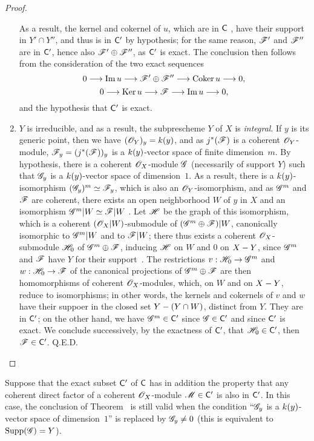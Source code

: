 \begin{proof}
\begin{enumerate}[label=(\alph*)]
    As a result, the kernel and cokernel of $u$, which are in $\mathsf{C}$ , have their support in $Y'\cap Y''$, and thus is in $\mathsf{C}'$ by hypothesis; for the same reason, $\mathscr{F}'$ and $\mathscr{F}''$ are in $\mathsf{C}'$, hence also $\mathscr{F}'\oplus\mathscr{F}''$, as $\mathsf{C}'$ is exact.
    The conclusion then follows from the consideration of the two exact sequences
    \[
      0\to\Im u\to\sh{F}'\oplus\sh{F}''\to\Coker u\to 0,
    \]
    \[
      0\to\Ker u\to\sh{F}\to\Im u\to 0,
    \]
    and the hypothesis that $\mathsf{C}'$ is exact.
  \item $Y$ is irreducible, and as a result, the subprescheme $Y$ of $X$ is \emph{integral}.
    If $y$ is its generic point, then we have $(\mathscr{O}_Y)_y=k(y)$, and as $j^*(\mathscr{F})$ is a coherent $\mathscr{O}_Y$-module, $\mathscr{F}_y=(j^*(\mathscr{F}))_y$ is a $k(y)$-vector space of finite dimension~$m$.
    By hypothesis, there is a coherent $\mathscr{O}_X$-module $\mathscr{G}$ (necessarily of support $Y$) such that $\mathscr{G}_y$ is a $k(y)$-vector space of dimension~$1$.
    As a result, there is a $k(y)$-isomorphism $(\mathscr{G}_y)^m\simeq\mathscr{F}_y$, which is also an $\mathscr{O}_Y$-isomorphism, and as $\mathscr{G}^m$ and $\mathscr{F}$ are coherent, there exists an open neighborhood $W$ of $y$ in $X$ and an isomorphism $\mathscr{G}^m|W\simeq\mathscr{F}|W$ .
    Let $\mathscr{H}$ be the graph of this isomorphism, which is a coherent $(\mathscr{O}_X|W)$-submodule of $(\mathscr{G}^m\oplus\mathscr{F})|W$, canonically isomorphic to $\mathscr{G}^m|W$ and to $\mathscr{F}|W$; there thus exists a coherent $\mathscr{O}_X$-submodule $\mathscr{H}_0$ of $\mathscr{G}^m\oplus\mathscr{F}$, inducing $\mathscr{H}$ on $W$ and $0$ on $X- Y$, since $\mathscr{G}^m$ and $\mathscr{F}$ have $Y$ for their support~.
    The restrictions $v:\sh{H}_0\to\sh{G}^m$ and $w:\sh{H}_0\to\sh{F}$ of the canonical projections of $\mathscr{G}^m\oplus\mathscr{F}$ are then homomorphisms of coherent $\mathscr{O}_X$-modules, which, on $W$ and on $X- Y$, reduce to isomorphisms; in other words, the kernels and cokernels of $v$ and $w$ have their suppoer in the closed set $Y-(Y\cap W)$, distinct from $Y$.
    They are in $\mathsf{C}'$; on the other hand, we have $\mathscr{G}^m\in\mathsf{C}'$ since $\mathscr{G}\in\mathsf{C}'$ and since $\mathsf{C}'$ is exact.
    We conclude successively, by the exactness of $\mathsf{C}'$, that $\mathscr{H}_0\in\mathsf{C}'$, then $\mathscr{F}\in\mathsf{C}'$.
Q.E.D.
\end{enumerate}
\end{proof}

\begin{cor}[3.1.3]
\label{3.3.1.3}
Suppose that the exact subset $\mathsf{C}'$ of $\mathsf{C}$ has in addition the property that any coherent direct factor of a coherent $\mathscr{O}_X$-module $\mathscr{M}\in\mathsf{C}'$ is also in $\mathsf{C}'$.
In this case, the conclusion of Theorem~ is still valid when the condition ``$\mathscr{G}_y$ is a $k(y)$-vector space of dimension~$1$'' is replaced by $\mathscr{G}_y\neq 0$ (this is equivalent to ${\mathop{\mathrm{Supp}}\nolimits}(\mathscr{G})=Y$).
\end{cor}


